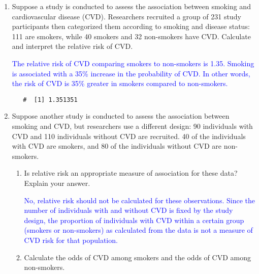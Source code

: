 \documentclass[letterpaper,12pt,twoside,]{pinp}
\begin{document}
\begin{enumerate}
\def\labelenumi{\arabic{enumi}.}
\setcounter{enumi}{6}
\item
  Suppose a study is conducted to assess the association between smoking
  and cardiovascular disease (CVD). Researchers recruited a group of 231
  study participants then categorized them according to smoking and
  disease status: 111 are smokers, while 40 smokers and 32 non-smokers
  have CVD. Calculate and interpret the relative risk of CVD.

  \textcolor{blue}{The relative risk of CVD comparing smokers to non-smokers is 1.35. Smoking is associated with a 35\% increase in the probability of CVD. In other words, the risk of CVD is 35\% greater in smokers compared to non-smokers. }

\begin{Shaded}
\begin{Highlighting}[]
\StringTok{ }\OperatorTok{/}
\StringTok{ }\OperatorTok{/}\NormalTok{(}\NormalTok{)}

\OperatorTok{/}\StringTok{ }
\end{Highlighting}
\end{Shaded}

  \begin{ShadedResult}
   \begin{verbatim}
   #  [1] 1.351351
   \end{verbatim}
   \end{ShadedResult}
\item
  Suppose another study is conducted to assess the association between
  smoking and CVD, but researchers use a different design: 90
  individuals with CVD and 110 individuals without CVD are recruited. 40
  of the individuals with CVD are smokers, and 80 of the individuals
  without CVD are non-smokers.

  \begin{enumerate}
  \def\labelenumii{\alph{enumii})}
  \item
    Is relative risk an appropriate measure of association for these
    data? Explain your answer.

    \textcolor{blue}{No, relative risk should not be calculated for these observations. Since the number of individuals with and without CVD is fixed by the study design, the proportion of individuals with CVD within a certain group (smokers or non-smokers) as calculated from the data is not a measure of CVD risk for that population.}
  \item
    Calculate the odds of CVD among smokers and the odds of CVD among
    non-smokers.


\end{enumerate}
\end{enumerate}
\end{document}
